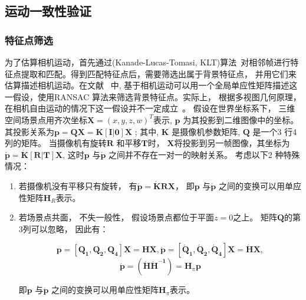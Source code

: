 \subsection{运动一致性验证}
\label{ch5:sec:sub:motionv}

\subsubsection{特征点筛选}
\label{ch5:sec:sub:sub:fp}
 为了估算相机运动，首先通过(Kanade-Lucas-Tomasi, KLT)算法~\cite{KLT}对相邻帧进行特征点提取和匹配。得到匹配特征点后，需要筛选出属于背景特征点， 并用它们来估算描述相机运动。在文献~\cite{5.8s} 中, 基于相机运动可以用一个全局单应性矩阵描述这一假设，使用RANSAC 算法来筛选背景特征点。实际上， 根据多视图几何原理，在相机自由运动的情况下这一假设并不一定成立~\cite{Multitransform}。 假设在世界坐标系下， 三维空间场景点用齐次坐标$\mathbf{X}={(x,y,z,w)}^T$表示, $\mathbf{p}$ 为其投影到二维图像中的坐标。其投影关系为$\mathbf{p} = \mathbf{QX} = \mathbf{K[I|0]X}$ ; 其中, $\mathbf{K}$ 是摄像机参数矩阵, $\mathbf{Q}$ 是一个3 行4 列的矩阵。 当摄像机有旋转$\mathbf{R}$ 和平移$\mathbf{T}$时， $\mathbf{X}$将投影到另一帧图像，其坐标为 $\mathbf{\acute{p}}=\mathbf{\acute{K}[R|T]X}$, 这时$\mathbf{p}$ 与$\mathbf{\acute{p}}$ 之间并不存在一对一的映射关系。 考虑以下2 种特殊情况：
 \begin{enumerate}
   \item 若摄像机没有平移只有旋转， 有$\mathbf{\acute{p}}=\mathbf{\acute{K}RX}$， 即$\mathbf{p}$ 与$\mathbf{\acute{p}}$ 之间的变换可以用单应性矩阵$\mathbf{H}_R$表示。
   \item 若场景点共面， 不失一般性， 假设场景点都位于平面$z=0$之上。 矩阵$\mathbf{Q}$的第3列可以忽略， 因此有：


    $$\mathbf{p}=[\mathbf{Q_1},\mathbf{Q_2},\mathbf{Q_4}]\mathbf{X} = \mathbf{HX},  \mathbf{\acute{p}}=[\mathbf{\acute{Q}_1},\mathbf{\acute{Q}_2},\mathbf{\acute{Q}_4}]\mathbf{X} = \mathbf{\acute{H}X},  $$
   $$ \mathbf{\acute{p}} = (\mathbf{\acute{H}\acute{H}^{-1}})=\mathbf{H}_{\pi} \mathbf{p} $$


  即$\mathbf{p}$ 与$\mathbf{\acute{p}}$ 之间的变换可以用单应性矩阵$\mathbf{H}_{\pi}$表示。
 \end{enumerate}


